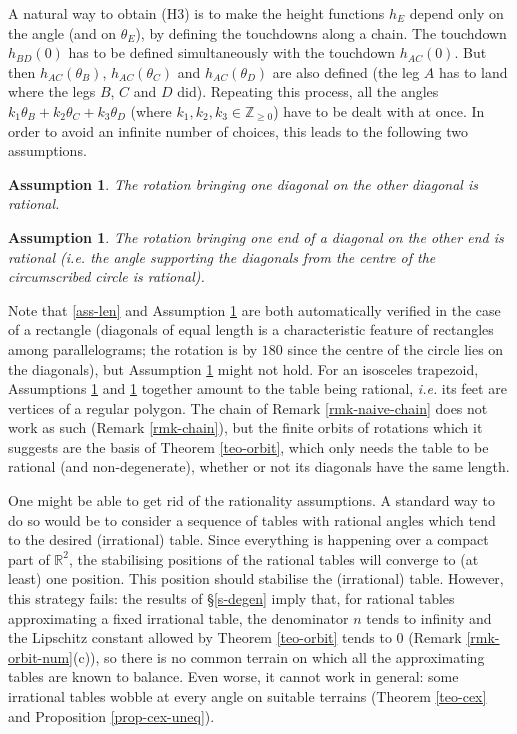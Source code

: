 \documentclass[a4paper,11pt,twoside,leqno]{article}
\newtheorem{assu}[teo]{Assumption}
\newcommand{\ie}[0]{\emph{i.e.} }
\newcommand{\rr}[0]{\ensuremath{\mathbb{R}}}
\newcommand{\zz}[0]{\ensuremath{\mathbb{Z}}}
\numberwithin{equation}{section}
\begin{document}
\begin{rmk}\label{rmk-naive-chain}
A natural way to obtain (H3) is to make the height functions $h_E$ depend only on the angle (and on $\theta_E$), by defining the touchdowns along a chain. The touchdown $h_{BD}(0)$ has to be defined simultaneously with the touchdown $h_{AC}(0)$. But then $h_{AC}(\theta_B)$, $h_{AC}(\theta_C)$ and $h_{AC}(\theta_D)$ are also defined (the leg $A$ has to land where the legs $B$, $C$ and $D$ did). Repeating this process, all the angles $k_1 \theta_B + k_2 \theta_C + k_3 \theta_D$ (where $k_1,k_2,k_3 \in \zz_{\geq 0}$) have to be dealt with at once. In order to avoid an infinite number of choices, this leads to the following two assumptions.
\end{rmk}

\begin{assu}\label{ass-rot2}
The rotation bringing one diagonal on the other diagonal is rational.
\end{assu}
\begin{assu}\label{ass-rot}
The rotation bringing one end of a diagonal on the other end is rational (\ie the angle supporting the diagonals from the centre of the circumscribed circle is rational).
\end{assu}

Note that \eqref{ass-len} and Assumption \ref{ass-rot} are both automatically verified in the case of a rectangle (diagonals of equal length is a characteristic feature of rectangles among parallelograms; the rotation is by $180$\textdegree{} since the centre of the circle lies on the diagonals), but Assumption \ref{ass-rot2} might not hold. For an isosceles trapezoid, Assumptions \ref{ass-rot2} and \ref{ass-rot} together amount to the table being rational, \ie its feet are vertices of a regular polygon. The chain of Remark \ref{rmk-naive-chain} does not work as such (Remark \ref{rmk-chain}), but the finite orbits of rotations which it suggests are the basis of Theorem \ref{teo-orbit}, which only needs the table to be rational (and non-degenerate), whether or not its diagonals have the same length.

\begin{rmk}\label{rmk-density}
One might be able to get rid of the rationality assumptions. 
A standard way to do so would be to consider a sequence of tables with rational angles which tend to the desired (irrational) table. 
Since everything is happening over a compact part of $\rr^2$, the stabilising positions of the rational tables will converge to (at least) one position.
This position should stabilise the (irrational) table.
However, this strategy fails: the results of \S{}\ref{s-degen} imply that, for rational tables approximating a fixed irrational table, the denominator $n$ tends to infinity and the Lipschitz constant allowed by Theorem \ref{teo-orbit} tends to $0$ (Remark \ref{rmk-orbit-num}(c)), so there is no common terrain on which all the approximating tables are known to balance. Even worse, it cannot work in general: some irrational tables wobble at every angle on suitable terrains (Theorem \ref{teo-cex} and Proposition \ref{prop-cex-uneq}).
\end{rmk}
 
\end{document}
